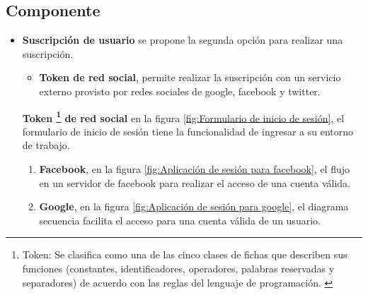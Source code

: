 \subsection{Componente}

\begin{itemize}

\item \textbf{Suscripción de usuario}
se propone la segunda opción para realizar una suscripción.

\begin{itemize}

\item \textbf{Token de red social}, permite realizar la suscripción con un
servicio externo provisto por redes sociales de google, facebook y twitter.

\end{itemize}

\textbf{Token \footnote{Token: Se clasifica como una de las cinco clases de
fichas que describen sus funciones (constantes, identificadores, operadores,
palabras reservadas y separadores) de acuerdo con las reglas del lenguaje de
programación. \cite{token}} de red social} en la figura \ref{fig:Formulario
de inicio de sesión}, el formulario de inicio de sesión tiene la funcionalidad
de ingresar a su entorno de trabajo.

\begin{minipage}{1.0\textwidth}
	\centering
	\label{fig:Formulario de inicio de sesión}
\end{minipage}

\begin{enumerate}

\item \textbf{Facebook}, en la figura \ref{fig:Aplicación de sesión para facebook},
el flujo en un servidor de facebook para realizar el acceso de una cuenta válida.

\begin{minipage}{1.0\textwidth}
	\centering
	\label{fig:Aplicación de sesión para facebook}
\end{minipage}

\item \textbf{Google}, en la figura \ref{fig:Aplicación de sesión para google}, el
diagrama secuencia facilita el acceso para una cuenta válida de un usuario.


\end{enumerate}
\end{itemize}

